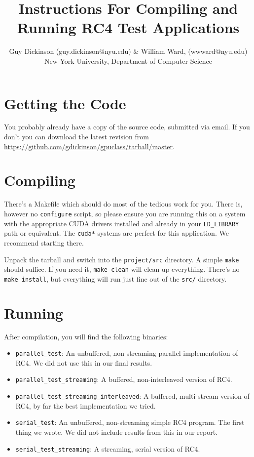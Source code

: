 \documentclass{article}
\begin{document}
  
  \title{Instructions For Compiling and Running RC4 Test Applications}
  \author{Guy Dickinson (guy.dickinson@nyu.edu) \& William Ward, (wwward@nyu.edu) \\ New York University, Department of Computer Science}
  \maketitle
  
  \section{Getting the Code}
  You probably already have a copy of the source code, submitted via email. If you don't you can download the latest revision from \url{https://github.com/gdickinson/gpuclass/tarball/master}.
  
  \section{Compiling}
  There's a Makefile which should do most of the tedious work for you. There is, however no \texttt{configure} script, so please ensure you are running this on a system with the appropriate CUDA drivers installed and already in your \texttt{LD\_LIBRARY} path or equivalent. The \texttt{cuda*} systems are perfect for this application. We recommend starting there.
  
  Unpack the tarball and switch into the \texttt{project/src} directory. A simple \texttt{make} should suffice. If you need it, \texttt{make clean} will clean up everything. There's no \texttt{make install}, but everything will run just fine out of the \texttt{src/} directory.
  
  \section{Running}
  After compilation, you will find the following binaries:
  
  \begin{itemize}
    \item \texttt{parallel\_test}: An unbuffered, non-streaming parallel implementation of RC4. We did not use this in our final results.
    \item \texttt{parallel\_test\_streaming}: A buffered, non-interleaved version of RC4.
    \item \texttt{parallel\_test\_streaming\_interleaved}: A buffered, multi-stream version of RC4, by far the best implementation we tried.
    \item \texttt{serial\_test}: An unbuffered, non-streaming simple RC4 program. The first thing we wrote. We did not include results from this in our report.
    \item \texttt{serial\_test\_streaming}: A streaming, serial version of RC4.
  \end{itemize}
  
\end{document}
